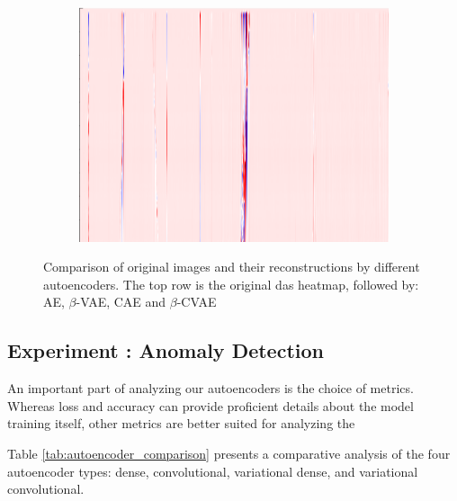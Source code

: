 \begin{figure}[!h]
\begin{subfigure}{0.33\textwidth}
        \includegraphics[width=\textwidth]{figures/test.png}
    \end{subfigure}
    
    \caption{Comparison of original images and their reconstructions by different autoencoders. The top row is the original \acrshort{das} heatmap, followed by: AE, $\beta$-VAE, CAE and $\beta$-CVAE}
    \label{fig:aereconstruct}
\end{figure}

\subsection{Experiment : Anomaly Detection}

An important part of analyzing our autoencoders is the choice of metrics. Whereas loss and accuracy can provide proficient details about the model training itself, other metrics are better suited for analyzing the 

Table \ref{tab:autoencoder_comparison} presents a comparative analysis of the four autoencoder types: dense, convolutional, variational dense, and variational convolutional.





